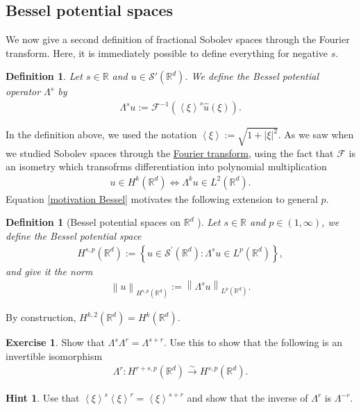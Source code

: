 \documentclass[
    a4paper,
    DIV=14,
    abstract=true,
    numbers=noenddot
]
{scrartcl}
\newtheorem{definition}[theorem]{Definition}
\theoremstyle{definition}
\newtheorem{exercise}{Exercise}
\newtheorem*{hint}{Hint}
\newcommand{\wh}[1]{\widehat{#1}}
\newcommand{\br}[1]{\left\langle#1\right\rangle}
\renewcommand{\norm}[1]{\left\lVert #1 \right\rVert}\renewcommand{\abs}[1]{\left| #1 \right|}
\newcommand{\iso}{\xrightarrow{\sim}}
\newcommand{\R}{\mathbb{R}}
\newcommand{\Ff}{\mathcal{F}}
\newcommand{\Ss}{\mathcal{S}}
\begin{document}
\subsection{Bessel potential spaces}
We now give a second definition of fractional Sobolev spaces through the Fourier transform. Here, it is immediately possible to define everything for negative $s$.
\begin{definition}
    Let  $s\in\R$ and $u \in \Ss'(\R^d)$. We define the \emph{Bessel potential operator} $\Lambda^s$ by
    \begin{align*}
        \Lambda^s u := \Ff^{-1}\left(\br{\xi}^s \wh{u}(\xi)\right).
    \end{align*}
\end{definition}
In the definition above, we used the notation $\br{\xi}:=\sqrt{1+|\xi|^2}$. As we saw when we studied Sobolev spaces through the \href{https://nowheredifferentiable.com/2023-01-29-PDE-1-Fourier/#:~:text=Sobolev%20spaces-,Sobolev%20spaces,-form%20a%20particular}{Fourier transform}, using the fact that $\Ff $ is an isometry which transofrms differentiation into polynomial multiplication
\begin{align}\label{motivation Bessel}
    u \in H^k(\R^d) \iff \Lambda^k u \in L^2(\R^d).
\end{align}
Equation \eqref{motivation Bessel} motivates the following extension to general $p$.

\begin{definition}[Bessel potential spaces on $\R^d$ ]\label{bessel potential def}
    Let $s \in \R$ and $p \in (1,\infty)$, we define the \emph{Bessel potential space}
    \begin{align*}
        H^{s,p}(\R^d):=\left\{u \in \mathcal{S}^{\prime}(\mathbb{R}^d): \Lambda ^s u \in L^p(\mathbb{R}^d)\right\},
    \end{align*}
    and give it the norm
    \begin{align*}
        \norm{u}_{H^{s,p}(\R^d)}:= \norm{\Lambda^s u}_{L^p(\R^d)}.
    \end{align*}
\end{definition}
By construction, $H^{k,2}(\R^d)=H^{k}(\R^d)$.
\begin{exercise}
    Show that $\Lambda^s\Lambda^r=\Lambda^{s+r}$. Use this to show that the following is an invertible isomorphism
    \begin{align*}
        \Lambda^r: H^{r+s,p}(\R^d) \iso  H^{s,p}(\R^d).
    \end{align*}
\end{exercise}
\begin{hint}
    Use that $\br{\xi}^s\br{\xi}^r=\br{\xi}^{s+r}$ and show that the inverse of $\Lambda^r$ is $\Lambda^{-r}$.
\end{hint}
\end{document}

